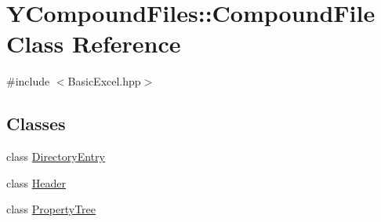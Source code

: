\hypertarget{class_y_compound_files_1_1_compound_file}{}\section{Y\+Compound\+Files\+:\+:Compound\+File Class Reference}
\label{class_y_compound_files_1_1_compound_file}


{\ttfamily \#include $<$Basic\+Excel.\+hpp$>$}

\subsection*{Classes}
\begin{DoxyCompactItemize}
\item 
class \hyperlink{class_y_compound_files_1_1_compound_file_1_1_directory_entry}{Directory\+Entry}
\item 
class \hyperlink{class_y_compound_files_1_1_compound_file_1_1_header}{Header}
\item 
class \hyperlink{class_y_compound_files_1_1_compound_file_1_1_property_tree}{Property\+Tree}
\end{DoxyCompactItemize}
